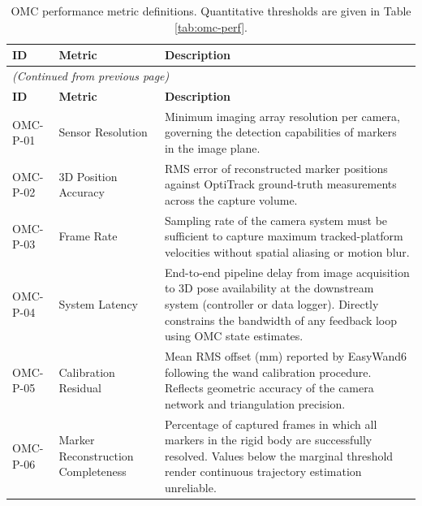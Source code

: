{\small\setlength{\tabcolsep}{4pt}
\begin{longtable}{p{1.5cm} >{\raggedright\arraybackslash}p{3.0cm} >{\raggedright\arraybackslash}p{\dimexpr\linewidth-1.5cm-3.0cm-6\tabcolsep\relax}}
\caption[OMC performance metric definitions.]{OMC performance metric definitions. Quantitative thresholds are given in Table \ref{tab:omc-perf}.}
\label{tab:omc-perf-desc}\\
\toprule
\textbf{ID} & \textbf{Metric} & \textbf{Description} \\
\midrule
\endfirsthead
\multicolumn{3}{l}{\small\textit{(Continued from previous page)}}\\[2pt]
\toprule
\textbf{ID} & \textbf{Metric} & \textbf{Description} \\
\midrule
\endhead
\bottomrule
\endlastfoot
OMC-P-01 & Sensor Resolution & Minimum imaging array resolution per camera, governing the detection capabilities of markers in the image plane. \\[4pt]
OMC-P-02 & 3D Position Accuracy & \gls{RMS} error of reconstructed marker positions against OptiTrack ground-truth measurements across the capture volume. \\[4pt]
OMC-P-03 & Frame Rate & Sampling rate of the camera system must be sufficient to capture maximum tracked-platform velocities without spatial aliasing or motion blur. \\[4pt]
OMC-P-04 & System Latency & End-to-end pipeline delay from image acquisition to 3D pose availability at the downstream system (controller or data logger). Directly constrains the bandwidth of any feedback loop using \gls{OMC} state estimates. \\[4pt]
OMC-P-05 & Calibration Residual & Mean \gls{RMS} offset (mm) reported by EasyWand6 following the wand calibration procedure. Reflects geometric accuracy of the camera network and triangulation precision. \\[4pt]
OMC-P-06 & Marker Reconstruction Completeness & Percentage of captured frames in which all markers in the rigid body are successfully resolved. Values below the marginal threshold render continuous trajectory estimation unreliable. \\
\end{longtable}}

